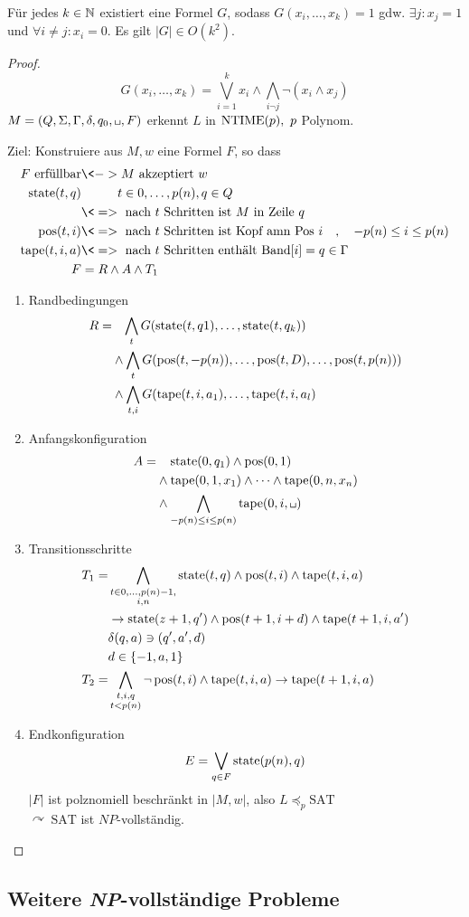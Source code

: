 \begin{lemma}
	Für jedes $k\in\mathbb{N}$ existiert eine Formel $G$, sodass $G(x_i,\dots,x_k)=1$ gdw. $\exists j: x_j = 1$ und $\forall i \neq j: x_i = 0$. Es gilt $|G| \in O(k^2)$.
\end{lemma}
\begin{proof}
	\[ G(x_i,\dots,x_k) = \bigvee_{i=1}^k x_i\land \bigwedge_{i\neg j}\neg (x_i\land x_j) \]
	$M=(Q,\Sigma,\Gamma,\delta,q_0,\blank,F)$ erkennt $L$ in $\operatorname{NTIME}(p),\ p$ Polynom.
	
	Ziel: Konstruiere aus $M,w$ eine Formel $F$, so dass
	\begin{align*}
		F\text{ erfüllbar} &\<-> M\text{ akzeptiert }w\\
		\state(t,q) &\phantom{\<->} t\in 0,\dots,p(n), q\in Q\\
		&\<=>\text{ nach $t$ Schritten ist $M$ in Zeile }q\\
		\pos(t,i) &\<=>\text{ nach $t$ Schritten ist Kopf amn Pos } i\quad,\quad -p(n)\leq i\leq p(n)\\
		\tape(t,i,a) &\<=>\text{ nach $t$ Schritten enthält Band}[i] = q\in\Gamma\\
		F &= R \land A\land T_1
	\end{align*}
	\begin{enumerate}
	\item Randbedingungen
		\begin{align*}
			R =&\phantom{\land}\, \bigwedge_t G(\operatorname{state}(t,q1),\dots,\operatorname{state}(t,q_k))\\
			& \land \bigwedge_t G(\operatorname{pos}(t,-p(n)),\dots,\operatorname{pos}(t,D),\dots,\operatorname{pos}(t,p(n)))\\
			& \land \bigwedge_{t,i} G(\operatorname{tape}(t,i,a_1),\dots,\operatorname{tape}(t,i,a_l)
		\end{align*}
	\item Anfangskonfiguration
		\begin{align*}
			A =&\phantom{\land}\; \state(0,q_1)\land \pos(0,1)\\
			&\land\tape(0,1,x_1)\land\dots\land\tape(0,n,x_n)\\
			&\land\bigwedge_{-p(n)\leq i\leq p(n)} \tape(0,i,\blank)
		\end{align*}
	\item Transitionsschritte
	\begin{align*}
		T_1 =& \bigwedge_{\substack{t\in 0,\dots,p(n)-1,\\i,n}} \state(t,q)\land \pos(t,i) \land \tape(t,i,a)\\
		&\-> \state(z+1,q')\land \pos(t+1,i+d) \land \tape(t+1,i,a')\\
		&\delta(q,a)\ni(q',a',d)\\
		&d\in\{-1,a,1\}\\
		T_2 =& \bigwedge_{\substack{t,i,q\\t<p(n)}} \neg \pos(t,i)\land \tape(t,i,a) \-> \tape(t+1,i,a)
	\end{align*}
	\item Endkonfiguration
		\[ E = \bigvee_{q\in F} \operatorname{state}(p(n),q) \]
		$|F|$ ist polznomiell beschränkt in $|M,w|$, also $L\preceq_p \mathrm{SAT}$\\
		$\curvearrowright\ \mathrm{SAT}$ ist $NP$-vollständig.
	\end{enumerate}
\end{proof}

\subsection{Weitere \textit{NP}-vollständige Probleme}


